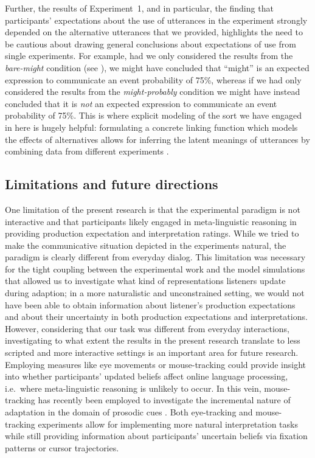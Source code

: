 Further, the results of Experiment~1, and in particular, the finding
that participants' expectations about the use of utterances in the experiment strongly depended on
the alternative utterances that we provided, highlights the need to be cautious about drawing general conclusions about expectations of use from single experiments. For example,
had we only considered the results from the \textit{bare-might} condition (see ),
we might have concluded that ``might'' is an expected expression to communicate an event probability of 75\%,
whereas if we had only considered the results from the \textit{might-probably} condition we might have instead concluded that it is \emph{not} an expected expression to communicate an event probability of 75\%.
This is where explicit modeling of the sort we have engaged in here is hugely helpful: formulating a concrete linking function which models the effects of 
alternatives allows for inferring the latent meanings of utterances by combining data from different experiments \cite[see also][for similar approaches]{Franke2014,Peloquin2016}.

\subsection{Limitations and future directions}

One limitation of the present research is that the experimental paradigm is not interactive and that participants likely engaged in meta-linguistic reasoning in providing production expectation and interpretation ratings. While we tried to make the communicative situation depicted in the experiments natural,
the paradigm is clearly different from everyday dialog. This limitation was necessary for the tight coupling between the experimental work
and the model simulations that allowed us to investigate what kind of representations listeners update during adaption; in a more
naturalistic and unconstrained setting, we would not have been able to obtain information about listener's production expectations and about their
uncertainty in both production expectations and interpretations. However, considering that our task was different from everyday interactions, investigating
to what extent the results in the present research translate to less scripted and more interactive settings is an important area for future research. Employing measures like eye movements or mouse-tracking could provide insight into whether participants' updated beliefs affect online language processing, i.e.~where meta-linguistic reasoning is unlikely to occur. In this vein, mouse-tracking has recently been
employed  to investigate the incremental nature of adaptation in the domain of  prosodic cues \cite{Roettger2019}. Both eye-tracking and mouse-tracking experiments 
allow for implementing more natural interpretation tasks while still providing information about participants' uncertain beliefs via fixation patterns or cursor trajectories.


